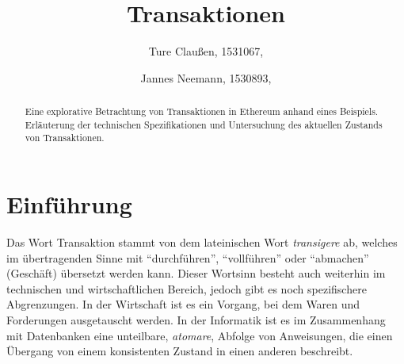 \documentclass[runningheads]{llncs}
\begin{document}
\title{Transaktionen}
\author{Ture Claußen, 1531067,  \and Jannes Neemann, 1530893, }
{\def\addcontentsline#1#2#3{}\maketitle} %


\begin{abstract}
  Eine explorative Betrachtung von Transaktionen in Ethereum anhand eines Beispiels. Erläuterung der technischen Spezifikationen und Untersuchung des aktuellen Zustands von Transaktionen.

\end{abstract}

\section{Einführung}
Das Wort Transaktion stammt von dem lateinischen Wort \textit{transigere} ab, welches im übertragenden Sinne mit "`durchführen"', "`vollführen"' oder "`abmachen"' (Geschäft) übersetzt werden kann. \cite{noauthor_transigere_nodate} Dieser Wortsinn besteht auch weiterhin im technischen und wirtschaftlichen Bereich, jedoch gibt es noch spezifischere Abgrenzungen. In der Wirtschaft ist es ein Vorgang, bei dem Waren und Forderungen ausgetauscht werden. \cite[S. 18 f.]{ehrlicher_kompendium_1975} In der Informatik ist es im Zusammenhang mit Datenbanken eine unteilbare, \textit{atomare}, Abfolge von Anweisungen, die einen Übergang von einem konsistenten Zustand in einen anderen beschreibt. \cite[S.520]{herold_grundlagen_2017}
\end{document}
